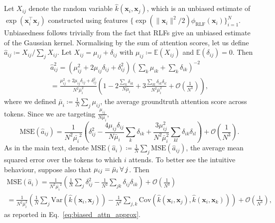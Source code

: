 Let $X_{ij}$ denote the random variable $\widehat{k}(\boldsymbol{x}_i, \boldsymbol{x}_j)$, which is an unbiased estimate of $\exp(\boldsymbol{x}_i^\top \boldsymbol{x}_j)$ constructed using features $\{\exp({\| \boldsymbol{x}_i \|^2}/{2}) \phi_\textrm{RLF}(\boldsymbol{x}_i) \}_{i=1}^N$.
Unbiasedness follows trivially from the fact that RLFs give an unbiased estimate of the Gaussian kernel.
Normalising by the sum of attention scores, let us define $\widehat{a}_{ij} \coloneqq X_{ij} / \sum_j  X_{ij}$.
Let $X_{ij} = \mu_{ij} + \delta_{ij}$ with $\mu_{ij} \coloneqq \mathbb{E}(X_{ij})$ and $\mathbb{E}(\delta_{ij})=0$.
Then
\begin{equation} 
\begin{multlined}
    \widehat{a}_{ij}^2 = (\mu_{ij}^2 + 2\mu_{ij}\delta_{ij} + \delta_{ij}^2)(\sum_k \mu_{ik} + \sum_k \delta_{ik})^{-2} 
    \\ = \frac{\mu_{ij}^2 + 2\mu_{ij}\delta_{ij} + \delta_{ij}^2}{N^2 \bar{\mu}_i^2} \left(1 - 2 \frac{\sum_k \delta_{ik}}{N \bar{\mu}_i} + 3 \frac{\sum_{kl} \delta_{ik}\delta_{il}}{N^2 \bar{\mu}_i^2}  + \mathcal{O}(\frac{1}{N^3}) \right),
\end{multlined}
\end{equation}
where we defined $\bar{\mu}_i \coloneqq \frac{1}{N}\sum_j \mu_{ij}$, the average groundtruth attention score across tokens. 
Since we are targeting $\frac{\mu_{ij}}{N \bar{\mu_i}}$,
\begin{equation} 
    \textrm{MSE}(\widehat{a}_{ij}) = \frac{1}{N^2 \bar{\mu_i}^2} \left(\delta_{ij}^2 - \frac{4 \mu_{ij} \delta_{ij}}{N \bar{\mu}_i} \sum_k \delta_{ik} + \frac{3\mu_{ij}^2}{N^2 \bar{\mu}_i^2} \sum_{kl} \delta_{ik} \delta_{il} \right) +  \mathcal{O}\left(\frac{1}{N^3}\right).
\end{equation}
As in the main text, denote $\textrm{MSE}(\widehat{a}_i)\coloneqq \frac{1}{N} \sum_j \textrm{MSE}(\widehat{a}_{ij})$, the average mean squared error over the tokens to which $i$ attends.
To better see the intuitive behaviour, suppose also that $\mu_{ij} = \bar{\mu}_i \hspace{0.2em} \forall \hspace{0.2em} j$. Then
\begin{equation} \label{eq:offset}
\begin{multlined}
    \textrm{MSE}(\widehat{a}_{i}) = \frac{1}{N^2 \bar{\mu_i}^2} \left(\frac{1}{N} \sum_j \delta_{ij}^2 - \frac{1}{N^2} \sum_{jk} \delta_{ij} \delta_{ik} \right) +  \mathcal{O}\left(\frac{1}{N^3}\right) 
    \\ =  \frac{1}{N^2 \bar{\mu}_i^2} \left( \frac{1}{N} \sum_{j} 
 \textrm{Var}(\widehat{k}(\boldsymbol{x}_i, \boldsymbol{x}_j)) - \frac{1}{N^2} \sum_{j, k}  \textrm{Cov}(\widehat{k}(\boldsymbol{x}_i, \boldsymbol{x}_{j}), \widehat{k}(\boldsymbol{x}_i, \boldsymbol{x}_{k})) \right) + \mathcal{O}\left(\frac{1}{N^3}\right),
    \end{multlined}
\end{equation}
as reported in Eq.~\ref{eq:biased_attn_approx}.

